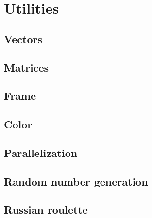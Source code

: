 \documentclass{article}
\begin{document}
\section{Utilities}

\subsection{Vectors}

\subsection{Matrices}

\subsection{Frame}

\subsection{Color}

\subsection{Parallelization}

\subsection{Random number generation}

\subsection{Russian roulette}

\end{document}
